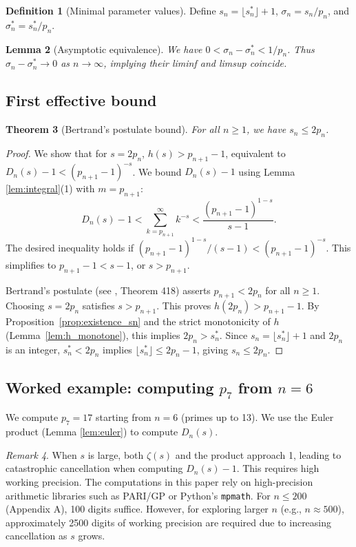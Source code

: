 \documentclass[12pt]{article}
\theoremstyle{plain}
\newtheorem{theorem}{Theorem}
\newtheorem{lemma}[theorem]{Lemma}
\theoremstyle{definition}
\newtheorem{definition}[theorem]{Definition}
\theoremstyle{remark}
\newtheorem{remark}[theorem]{Remark}
\begin{document}
\begin{definition}[Minimal parameter values]
\label{def:minimal}
Define $s_n = \lfloor s_n^* \rfloor + 1$, $\sigma_n = s_n/p_n$, and $\sigma_n^* = s_n^*/p_n$.
\end{definition}

\begin{lemma}[Asymptotic equivalence]
\label{lem:equiv}
We have $0 < \sigma_n - \sigma_n^* < 1/p_n$. Thus $\sigma_n - \sigma_n^* \to 0$ as $n \to \infty$, implying their liminf and limsup coincide.
\end{lemma}

\subsection{First effective bound}

\begin{theorem}[Bertrand's postulate bound]
\label{thm:bertrand}
For all $n \ge 1$, we have $s_n \leq 2p_n$.
\end{theorem}

\begin{proof}
We show that for $s = 2p_n$, $h(s) > p_{n+1} - 1$, equivalent to $D_n(s)-1 < (p_{n+1}-1)^{-s}$.
We bound $D_n(s)-1$ using Lemma \ref{lem:integral}(1) with $m=p_{n+1}$:
\[
D_n(s) - 1 < \sum_{k=p_{n+1}}^{\infty} k^{-s} < \frac{(p_{n+1}-1)^{1-s}}{s-1}.
\]
The desired inequality holds if $(p_{n+1}-1)^{1-s}/(s-1) < (p_{n+1}-1)^{-s}$. This simplifies to $p_{n+1}-1 < s-1$, or $s > p_{n+1}$.

Bertrand's postulate (see \cite{HardyWright}, Theorem 418) asserts $p_{n+1} < 2p_n$ for all $n \geq 1$. Choosing $s = 2p_n$ satisfies $s > p_{n+1}$. This proves $h(2p_n) > p_{n+1}-1$. By Proposition~\ref{prop:existence_sn} and the strict monotonicity of $h$ (Lemma~\ref{lem:h_monotone}), this implies $2p_n > s_n^*$. Since $s_n = \lfloor s_n^* \rfloor + 1$ and $2p_n$ is an integer, $s_n^* < 2p_n$ implies $\lfloor s_n^* \rfloor \leq 2p_n - 1$, giving $s_n \leq 2p_n$.
\end{proof}

\subsection{Worked example: computing $p_7$ from $n=6$}

We compute $p_7 = 17$ starting from $n=6$ (primes up to 13). We use the Euler product (Lemma \ref{lem:euler}) to compute $D_n(s)$.

\begin{remark}
\label{rem:precision_example}
When $s$ is large, both $\zeta(s)$ and the product approach 1, leading to catastrophic cancellation when computing $D_n(s)-1$. This requires high working precision. The computations in this paper rely on high-precision arithmetic libraries such as PARI/GP \cite{PARI2023} or Python's \texttt{mpmath}. For $n \leq 200$ (Appendix A), 100 digits suffice. However, for exploring larger $n$ (e.g., $n \approx 500$), approximately 2500 digits of working precision are required due to increasing cancellation as $s$ grows.
\end{remark}
\end{document}
